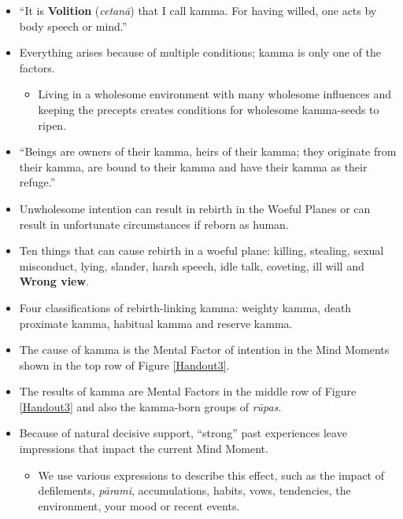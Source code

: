 \begin{itemize}

\item “It is \textbf{Volition} (\textit{cetanā}) that I call kamma. For having willed, one acts by body speech or mind.”

\item Everything arises because of multiple conditions; kamma is only one of the factors.

\begin{itemize}

\item Living in a wholesome environment with many wholesome influences and keeping the precepts creates conditions for wholesome kamma-seeds to ripen.

\end{itemize}

\item “Beings are owners of their kamma, heirs of their kamma; they originate from their kamma, are bound to their kamma and have their kamma as their refuge.”

\item Unwholesome intention can result in rebirth in the Woeful Planes or can result in unfortunate circumstances if reborn as human.

\item Ten things that can cause rebirth in a woeful plane: killing, stealing, sexual misconduct, lying, slander, harsh speech, idle talk, coveting, ill will and \textbf{Wrong view}.

\item Four classifications of rebirth-linking kamma: weighty kamma, death proximate kamma, habitual kamma and reserve kamma.

\item The cause of kamma is the Mental Factor of intention in the Mind Moments shown in the top row of Figure \ref{Handout3}.

\item The results of kamma are Mental Factors in the middle row of Figure \ref{Handout3} and also the kamma-born groups of \textit{rūpas}.

\item Because of natural decisive support, “strong” past experiences leave impressions that impact the current Mind Moment.

\begin{itemize}

\item We use various expressions to describe this effect, such as the impact of defilements, \textit{pārami}, accumulations, habits, vows, tendencies, the environment, your mood or recent events.


\end{itemize}
\end{itemize}

